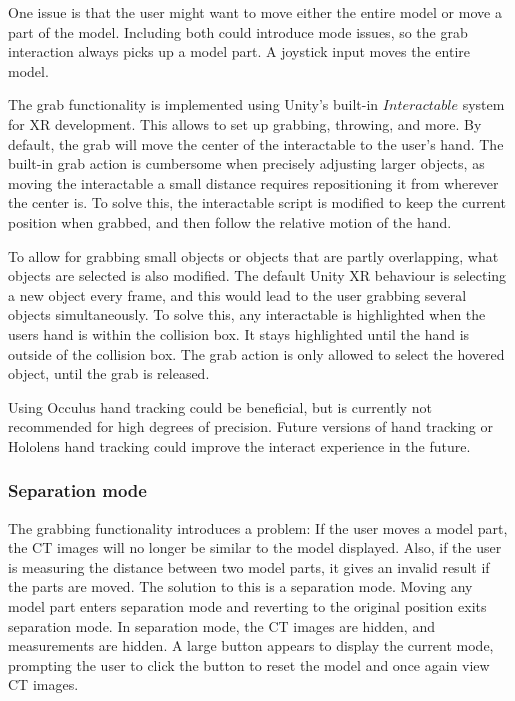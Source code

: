 \documentclass[a4paper]{report}
\begin{document}
One issue is that the user might want to move either the entire model or move a part of the model. Including both could introduce mode issues\cite{nngroup}, so the grab interaction always picks up a model part. A joystick input moves the entire model.

The grab functionality is implemented using Unity's built-in $Interactable$ system for XR\cite{noauthor_xr_nodate} development. This allows to set up grabbing, throwing, and more. 
By default, the grab will move the center of the interactable to the user's hand. The built-in grab action is cumbersome when precisely adjusting larger objects, as moving the interactable a small distance requires repositioning it from wherever the center is. 
To solve this, the interactable script is modified to keep the current position when grabbed, and then follow the relative motion of the hand.

To allow for grabbing small objects or objects that are partly overlapping, what objects are selected is also modified. The default Unity XR behaviour is selecting a new object every frame, and this would lead to the user grabbing several objects simultaneously. To solve this, any interactable is highlighted when the users hand is within the collision box. It stays highlighted until the hand is outside of the collision box. The grab action is only allowed to select the hovered object, until the grab is released.

Using Occulus hand tracking\cite{hand tracking} could be beneficial, but is currently not recommended for high degrees of precision. Future versions of hand tracking or Hololens hand tracking could improve the interact experience in the future.


\subsubsection{Separation mode}
The grabbing functionality introduces a problem: If the user moves a model part, the CT images will no longer be similar to the model displayed. Also, if the user is measuring the distance between two model parts, it gives an invalid result if the parts are moved. 
The solution to this is a separation mode. Moving any model part enters separation mode and reverting to the original position exits separation mode. In separation mode, the CT images are hidden, and measurements are hidden. A large button appears to display the current mode, prompting the user to click the button to reset the model and once again view CT images.
\end{document}
